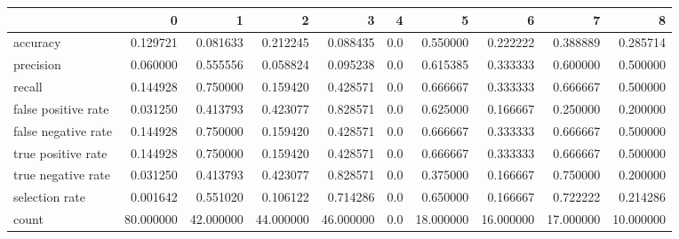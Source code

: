 \begin{tabular}{lrrrrrrrrr}
\toprule
{} &          0 &          1 &          2 &          3 &    4 &          5 &          6 &          7 &          8 \\
\midrule
accuracy            &   0.129721 &   0.081633 &   0.212245 &   0.088435 &  0.0 &   0.550000 &   0.222222 &   0.388889 &   0.285714 \\
precision           &   0.060000 &   0.555556 &   0.058824 &   0.095238 &  0.0 &   0.615385 &   0.333333 &   0.600000 &   0.500000 \\
recall              &   0.144928 &   0.750000 &   0.159420 &   0.428571 &  0.0 &   0.666667 &   0.333333 &   0.666667 &   0.500000 \\
false positive rate &   0.031250 &   0.413793 &   0.423077 &   0.828571 &  0.0 &   0.625000 &   0.166667 &   0.250000 &   0.200000 \\
false negative rate &   0.144928 &   0.750000 &   0.159420 &   0.428571 &  0.0 &   0.666667 &   0.333333 &   0.666667 &   0.500000 \\
true positive rate  &   0.144928 &   0.750000 &   0.159420 &   0.428571 &  0.0 &   0.666667 &   0.333333 &   0.666667 &   0.500000 \\
true negative rate  &   0.031250 &   0.413793 &   0.423077 &   0.828571 &  0.0 &   0.375000 &   0.166667 &   0.750000 &   0.200000 \\
selection rate      &   0.001642 &   0.551020 &   0.106122 &   0.714286 &  0.0 &   0.650000 &   0.166667 &   0.722222 &   0.214286 \\
count               &  80.000000 &  42.000000 &  44.000000 &  46.000000 &  0.0 &  18.000000 &  16.000000 &  17.000000 &  10.000000 \\
\bottomrule
\end{tabular}
